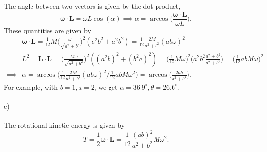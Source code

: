 \documentclass{article}
\begin{document}
        The angle between two vectors is given by the dot product,
        \begin{equation*}
            \boldsymbol \omega \cdot \mathbf{L} = \omega L \cos(\alpha) \implies \alpha = \arccos\bigg( \frac{\boldsymbol \omega \cdot \mathbf{L}}{\omega L}\bigg).
        \end{equation*}
        These quantities are given by
        \begin{align*}
            &\boldsymbol \omega \cdot \mathbf{L}  = \frac{1}{12} M \bigg( \frac{\omega}{\sqrt{a^2 + b^2}}\bigg)^2 (a^2b^2 + a^2b^2) = \frac{1}{12}\frac{2M}{a^2+ b^2} ( ab\omega)^2 \\
            &L^2 = \mathbf{L} \cdot \mathbf{L} = \bigg(\frac{M \omega}{\sqrt{a^2 + b^2}}\bigg)^2 ((a^2b)^2 + (b^2a)^2) = \bigg( \frac{1}{12}M \omega\bigg)^2 \bigg( a^2b^2\frac{a^2 + b^2}{a^2 + b^2}\bigg) = \bigg( \frac{1}{12} abM\omega \bigg)^2 \\
        \implies & \alpha = \arccos \bigg( 
            \frac{1}{12}\frac{2M}{a^2+ b^2} ( ab\omega)^2 \bigg/ \frac{1}{12} abM\omega^2 \bigg)
            = \arccos\bigg(\frac{2ab}{a^2 + b^2}\bigg).
        \end{align*}
        For example, with $b=1, a=2$, we get $\alpha = 36.9^\circ, \theta = 26.6^\circ$.
        \\ \\
        c) 
        \\ \\
        The rotational kinetic energy is given by 
        \begin{equation*}
            T = \frac{1}{2} \boldsymbol \omega \cdot \mathbf{L} = \frac{1}{12}\frac{( ab)^2}{a^2+ b^2} M \omega^2.
    \end{equation*}
\end{document}

